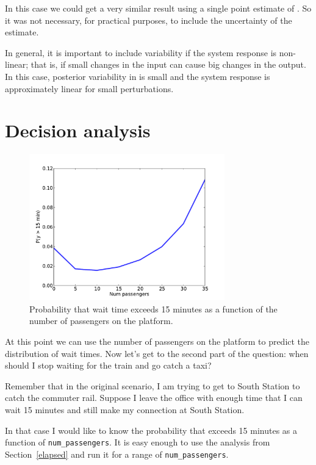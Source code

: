 \documentclass[12pt]{book}
\theoremstyle{exercise}
\begin{document}
In this case we could get a very similar result using a single point
estimate of .  So it was not necessary, for practical purposes,
to include the uncertainty of the estimate.

In general, it is important to include variability if the system
response is non-linear; that is, if small changes in the input can
cause big changes in the output.  In this case, posterior variability
in  is small and the system response is approximately
linear for small perturbations.


\section{Decision analysis}

\begin{figure}
\centerline{\includegraphics[height=2.5in]{figs/redline5.pdf}}
\caption{Probability that wait time exceeds 15 minutes as
a function of the number of passengers on the platform. }
\label{fig.redline5}
\end{figure}

At this point we can use the number of passengers on the platform
to predict the distribution of wait times.  Now
let's get to the second part of the question: when should I stop
waiting for the train and go catch a taxi?

Remember that in the original scenario, I am trying to get to
South Station to catch the commuter rail.  Suppose I leave
the office with enough time that I can wait 15 minutes
and still make my connection at South Station.

In that case I would like to know the probability that  exceeds
15 minutes as a function of \verb"num_passengers".  It is easy enough
to use the
analysis from Section~\ref{elapsed} and run it for a range of
\verb"num_passengers".
\end{document}
